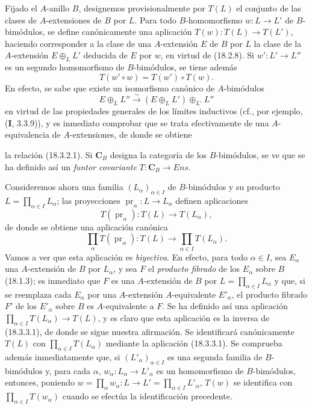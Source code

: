 \begin{env}[18.3.2]
\label{0.18.3.2-es}
Fijado el $A$-anillo $B$, designemos provisionalmente por $T(L)$ el conjunto
de las clases de $A$-extensiones de $B$ por $L$. Para todo $B$-homomorfismo
$w:L\to L'$ de $B$-bimódulos, se define canónicamente una aplicación
$T(w):T(L)\to T(L')$, haciendo corresponder a la clase de una $A$-extensión
$E$ de $B$ por $L$ la clase de la $A$-extensión $E\oplus_LL'$ deducida de $E$
por $w$, en virtud de (18.2.8). Si $w':L'\to L''$ es un segundo homomorfismo
de $B$-bimódulos, se tiene además
\begin{equation}
\label{0.18.3.2.1-es}
\tag{18.3.2.1}
  T(w'\circ w)=T(w')\circ T(w).
\end{equation}
En efecto, se sabe que existe un isomorfismo canónico de $A$-bimódulos
\[
  E\oplus_LL''\xrightarrow{\sim}(E\oplus_LL')\oplus_{L'}L''
\]
en virtud de las propiedades generales de los límites inductivos (cf., por
ejemplo, (\textbf{I}, 3.3.9)), y es inmediato comprobar que se trata
efectivamente de una $A$-equivalencia de $A$-extensiones, de donde se obtiene


la relación (18.3.2.1). Si $\boldsymbol{C}_B$ designa la categoría de los
$B$-bimódulos, se ve que se ha definido así un \emph{funtor covariante}
$T:\boldsymbol C_B\to\boldsymbol{\mathit{Ens}}$.
\end{env}

\begin{env}[18.3.3]
\label{0.18.3.3-es}
Consideremos ahora una familia $(L_\alpha)_{\alpha\in I}$ de $B$-bimódulos y
su producto $L=\prod_{\alpha\in I}L_\alpha$; las proyecciones
$\operatorname{pr}_\alpha:L\to L_\alpha$ definen aplicaciones
\[
  T(\operatorname{pr}_\alpha):T(L)\to T(L_\alpha),
\]
de donde se obtiene una aplicación canónica
\begin{equation}
\label{0.18.3.3.1-es}
\tag{18.3.3.1}
  \prod_\alpha T(\operatorname{pr}_\alpha):T(L)
  \longrightarrow\prod_{\alpha\in I}T(L_\alpha).
\end{equation}
Vamos a ver que esta aplicación es \emph{biyectiva}. En efecto, para todo
$\alpha\in I$, sea $E_\alpha$ una $A$-extensión de $B$ por $L_\alpha$, y sea
$F$ el \emph{producto fibrado} de los $E_\alpha$ sobre $B$ (18.1.3); es
inmediato que $F$ es una $A$-extensión de $B$ por
$L=\prod_{\alpha\in I}L_\alpha$ y que, si se reemplaza cada $E_\alpha$ por una
$A$-extensión $A$-equivalente $E'_\alpha$, el producto fibrado $F'$ de los
$E'_\alpha$ sobre $B$ es $A$-equivalente a $F$. Se ha definido así una
aplicación $\prod_{\alpha\in I}T(L_\alpha)\to T(L)$, y es claro que esta
aplicación es la inversa de (18.3.3.1), de donde se sigue nuestra afirmación.
Se identificará canónicamente $T(L)$ con
$\prod_{\alpha\in I}T(L_\alpha)$ mediante la aplicación (18.3.3.1). Se
comprueba además inmediatamente que, si $(L'_\alpha)_{\alpha\in I}$ es una
segunda familia de $B$-bimódulos y, para cada $\alpha$,
$w_\alpha:L_\alpha\to L'_\alpha$ es un homomorfismo de $B$-bimódulos,
entonces, poniendo
$w=\prod_\alpha w_\alpha:L\to L'=\prod_{\alpha\in I}L'_\alpha$, $T(w)$ se
identifica con $\prod_{\alpha\in I}T(w_\alpha)$ cuando se efectúa la
identificación precedente.
\end{env}

